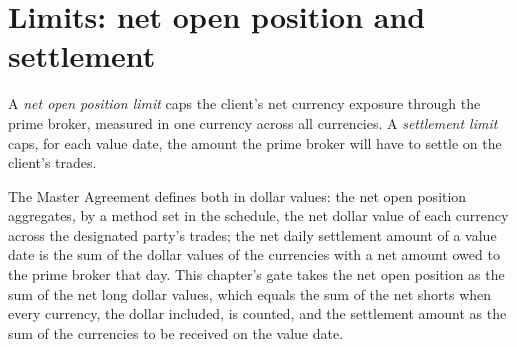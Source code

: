 \begin{omfigure}
\centering
{}

\label{fig:m2:getting-access-fx:pop}
\end{omfigure}

\section{Limits: net open position and settlement}

\begin{definition}\label{def:m2:getting-access-fx:limits}
A \emph{net open position limit} caps the client's net
currency exposure through the prime broker, measured in one currency across all
currencies. A \emph{settlement limit} caps, for each value date,
the amount the prime broker will have to settle on the client's trades.
\end{definition}

The Master Agreement defines both in dollar values: the net open position aggregates,
by a method set in the schedule, the net dollar value of each currency across the
designated party's trades; the net daily settlement amount of a value date is the sum
of the dollar values of the currencies with a net amount owed to the prime broker that
day. This chapter's gate takes the net open position as the sum of the net long dollar
values, which equals the sum of the net shorts when every currency, the dollar
included, is counted, and the settlement amount as the sum of the currencies to be
received on the value date.

